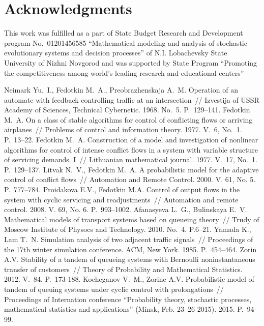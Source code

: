 \documentclass[runningheads,a4paper]{llncs}
\begin{document}
\section{Acknowledgments}

This work was fulfilled as a part of State Budget Research and Development program No.~01201456585
``Mathematical modeling and analysis of stochastic evolutionary systems and decision processes'' of
N.I. Lobachevsky State University of Nizhni Novgorod and was supported by State Program ``Promoting
the competitiveness among world's leading research and educational centers''


\begin{thebibliography}{99}
 Neimark Yu.~I., Fedotkin M.~A., Preobrazhenskaja A.~M. Operation of an automate
  with feedback controlling traffic at an intersection~// Izvestija of USSR Academy of Sciences,
  Technical Cybernetic. 1968. No.~5. P.~129--141.
  Fedotkin M.~A. On a class of stable algorithms for control of conflicting flows or arriving
  airplanes~// Problems of control and information theory. 1977. V.~6, No.~1. P.~13--22.
  Fedotkin M.~A. Construction of a model and investigation of nonlinear algorithms for control of
  intense conflict flows in a system with variable structure of servicing demands. I~// Lithuanian
  mathematical journal. 1977. V.~17, No.~1. P.~129--137.
%
  Litvak N.~V., Fedotkin M.~A. A probabilistic model for the
  adaptive control of conflict flows~// Automation and Remote Control. 2000. V. 61, No. 5. P.~777--784.
%
  Proidakova E.V., Fedotkin M.A. Control of output flows in the system with cyclic servicing and
  readjustments~// Automation and remote control. 2008. V. 69, No. 6. P.~993--1002.
%
  Afanasyeva L.~G., Bulinskaya E.~V. Mathematical models of transport systems based on queueing
  theory~// Trudy of Moscow Institute of Physocs and Technology. 2010. No.~4. P.6--21. 
  Yamada K., Lam T.~N. Simulation analysis of two adjacent traffic signals~// Proceedings of the
  17th winter simulation conference. ACM, New York. 1985. P.~454--464.
%
  Zorin A.V. Stability of a tandem of queueing systems with Bernoulli noninstantaneous transfer of
  customers~// Theory of Probability and Mathematical Statistics. 2012. V.~84. P.~173-188.
  Kocheganov V.~M., Zorine A.V. Probabilistic model of tandem of queuing systems under cyclic
  control with prolongations~// Proceedings of Internation conference ``Probability theory, stochastic processes, mathematical statistics
  and applications'' (Minsk, Feb. 23--26 2015). 2015. P.~94-99.
\end{thebibliography}
\end{document}
